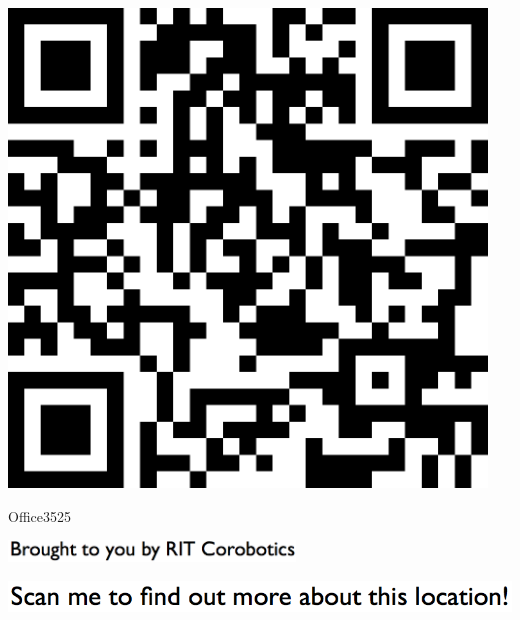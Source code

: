 \documentclass[letterpaper]{article}
\begin{document}
 \begingroup 
 \centerline{\includegraphics[scale=1,width=5in,height=5in]{Office3525.png}} 
 \endgroup 
 \vspace*{\fill} 

 \hfill{\small Office3525} 

  \vspace{0.7in} 
 
 \centerline{\includegraphics[scale=1,width=3in]{text-bottom.png}} 
 
 \pagebreak 
{} 
 \vspace*{\fill} 
 
  \centerline{\includegraphics[scale=1,width=6in]{text-top.png}} 
 
 \vspace{0.5in} 
 
\end{document}
